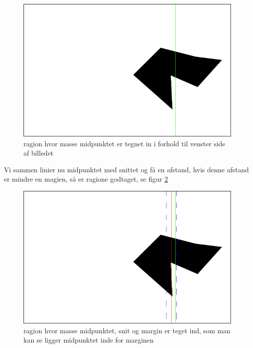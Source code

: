 \begin{figure}[h]
	\begin{center}
		\includegraphics[scale=0.5,angle=0]{afsnit/vores_implementation/billeder/udvidet_loesning/centerOfmass.png}
	\end{center}
	\caption[]{ragion hvor masse midpunktet er tegnet in i forhold til venster side af billedet}
	\label{midpunkt}
\end{figure}

Vi sammen linier nu midpunktet med snittet og få en afstand, hvis denne
afstand er mindre en magien, så er ragione godtaget, se figur
\ref{cOMCutMargin}

\begin{figure}[h]
	\begin{center}
		\includegraphics[scale=0.5,angle=0]{afsnit/vores_implementation/billeder/udvidet_loesning/cOMCutMargin.png}
	\end{center}
	\caption[]{ragion hvor masse midpunktet, snit og margin er teget ind, som man kan se ligger midpunktet inde for marginen}
	\label{cOMCutMargin}
\end{figure}

